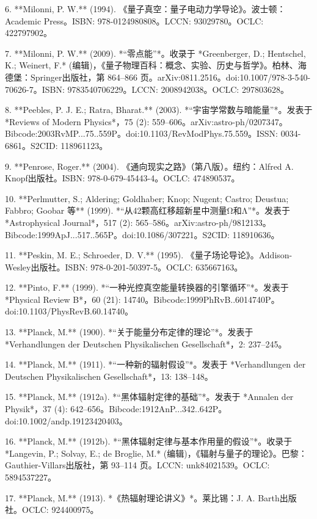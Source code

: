 \begin{itemize}
6. **Milonni, P. W.** (1994). 《量子真空：量子电动力学导论》。波士顿：Academic Press。ISBN: 978-0124980808。LCCN: 93029780。OCLC: 422797902。

7. **Milonni, P. W.** (2009). *“零点能”*。收录于 *Greenberger, D.; Hentschel, K.; Weinert, F.* (编辑)，《量子物理百科：概念、实验、历史与哲学》。柏林、海德堡：Springer出版社，第 864–866 页。arXiv:0811.2516。doi:10.1007/978-3-540-70626-7。ISBN: 9783540706229。LCCN: 2008942038。OCLC: 297803628。

8. **Peebles, P. J. E.; Ratra, Bharat.** (2003). *“宇宙学常数与暗能量”*。发表于 *Reviews of Modern Physics*，75 (2): 559–606。arXiv:astro-ph/0207347。Bibcode:2003RvMP...75..559P。doi:10.1103/RevModPhys.75.559。ISSN: 0034-6861。S2CID: 118961123。

9. **Penrose, Roger.** (2004). 《通向现实之路》（第八版）。纽约：Alfred A. Knopf出版社。ISBN: 978-0-679-45443-4。OCLC: 474890537。

10. **Perlmutter, S.; Aldering; Goldhaber; Knop; Nugent; Castro; Deustua; Fabbro; Goobar 等** (1999). *“从42颗高红移超新星中测量Ω和Λ”*。发表于 *Astrophysical Journal*，517 (2): 565–586。arXiv:astro-ph/9812133。Bibcode:1999ApJ...517..565P。doi:10.1086/307221。S2CID: 118910636。

11. **Peskin, M. E.; Schroeder, D. V.** (1995). 《量子场论导论》。Addison-Wesley出版社。ISBN: 978-0-201-50397-5。OCLC: 635667163。

12. **Pinto, F.** (1999). *“一种光控真空能量转换器的引擎循环”*。发表于 *Physical Review B*，60 (21): 14740。Bibcode:1999PhRvB..6014740P。doi:10.1103/PhysRevB.60.14740。

13. **Planck, M.** (1900). *“关于能量分布定律的理论”*。发表于 *Verhandlungen der Deutschen Physikalischen Gesellschaft*，2: 237–245。

14. **Planck, M.** (1911). *“一种新的辐射假设”*。发表于 *Verhandlungen der Deutschen Physikalischen Gesellschaft*，13: 138–148。

15. **Planck, M.** (1912a). *“黑体辐射定律的基础”*。发表于 *Annalen der Physik*，37 (4): 642–656。Bibcode:1912AnP...342..642P。doi:10.1002/andp.19123420403。

16. **Planck, M.** (1912b). *“黑体辐射定律与基本作用量的假设”*。收录于 *Langevin, P.; Solvay, E.; de Broglie, M.* (编辑)，《辐射与量子的理论》。巴黎：Gauthier-Villars出版社，第 93–114 页。LCCN: unk84021539。OCLC: 5894537227。

17. **Planck, M.** (1913). *《热辐射理论讲义》*。莱比锡：J. A. Barth出版社。OCLC: 924400975。
\end{itemize}